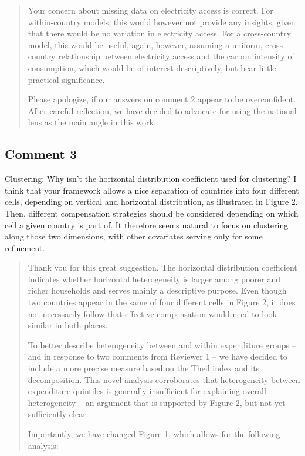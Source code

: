 \documentclass[11pt]{article}
\newenvironment{response}
{\begin{quote}\color{black}}
{\end{quote}}
\begin{document}
\begin{response}
    Your concern about missing data on electricity access is correct. For within-country models, this would however not provide any insights, given that there would be no variation in electricity access. For a cross-country model, this would be useful, again, however, assuming a uniform, cross-country relationship between electricity access and the carbon intensity of consumption, which would be of interest descriptively, but bear little practical significance.

    Please apologize, if our answers on comment 2 appear to be overconfident. After careful reflection, we have decided to advocate for using the national lens as the main angle in this work.
\end{response}

\subsection*{Comment 3}\label{comment_R2_3}

\begin{commentbox}
    Clustering: Why isn’t the horizontal distribution coefficient used for clustering? I think that your framework allows a nice separation of countries into four different cells, depending on vertical and horizontal distribution, as illustrated in Figure 2. Then, different compensation strategies should be considered depending on which cell a given country is part of. It therefore seems natural to focus on clustering along those two dimensions, with other covariates serving only for some refinement.
\end{commentbox}

\begin{response}
    Thank you for this great suggestion. The horizontal distribution coefficient indicates whether horizontal heterogeneity is larger among poorer and richer households and serves mainly a descriptive purpose. Even though two countries appear in the same of four different cells in Figure 2, it does not necessarily follow that effective compensation would need to look similar in both places. 
    
    To better describe heterogeneity between and within expenditure groups -- and in response to two comments from Reviewer 1 -- we have decided to include a more precise measure based on the Theil index and its decomposition. This novel analysis corroborates that heterogeneity between expenditure quintiles is generally insufficient for explaining overall heterogeneity -- an argument that is supported by Figure 2, but not yet sufficiently clear.

    Importantly, we have changed Figure 1, which allows for the following analysis:

\end{response}
\end{document}
